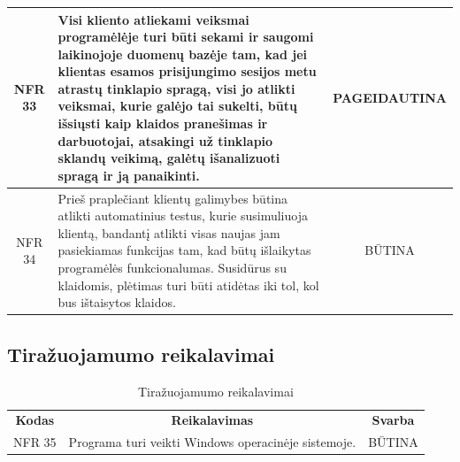 \documentclass{VUMIFPSkursinis}
\begin{document}
{{{{{\begin{center}
\begin{table}[H]
\begin{tabular}{|p{2cm}|p{}|p{}|}
	\hline 	
		\multicolumn{1}{|c|}{NFR 33}&
		{Visi kliento atliekami veiksmai programėlėje turi būti sekami ir saugomi laikinojoje duomenų bazėje tam, kad jei klientas esamos prisijungimo sesijos metu atrastų tinklapio spragą, visi jo atlikti veiksmai, kurie galėjo tai sukelti, būtų išsiųsti kaip klaidos pranešimas ir darbuotojai, atsakingi už tinklapio sklandų veikimą, galėtų išanalizuoti spragą ir ją panaikinti.}&
		\multicolumn{1}{|p{1.5cm}|}{PAGEIDAUTINA}\\
	
	\hline 	
		\multicolumn{1}{|c|}{NFR 34}&
		{Prieš praplečiant klientų galimybes būtina atlikti automatinius testus, kurie susimuliuoja klientą, bandantį atlikti visas naujas jam pasiekiamas funkcijas tam, kad būtų išlaikytas programėlės funkcionalumas. Susidūrus su klaidomis, plėtimas turi būti atidėtas iki tol, kol bus ištaisytos klaidos.}&
		\multicolumn{1}{|c|}{BŪTINA}\\	
		
	\hline 	
	
	\end{tabular}
	
	\label{table:Aptarnavimoirpriežiūrosreikalavimai}
	\end{table}

\end{center}

\subsection{Tiražuojamumo reikalavimai}
\begin{center}
	\begin{table}[H]
	\caption{Tiražuojamumo reikalavimai}
	\begin{tabular}{|p{2cm}|p{}|p{}|}
	\hline
	    \rowcolor{lightgray}
		\multicolumn{3}{|c|}{Tiražuojamumo reikalavimai}\\
		
	\hline
		\multicolumn{1}{|c|}{{\bfseries Kodas}}&
		\multicolumn{1}{|c|}{{\bfseries Reikalavimas}}&
		\multicolumn{1}{|c|}{{\bfseries Svarba}}\\
	\hline 	
		\multicolumn{1}{|c|}{NFR 35}&
		{Programa turi veikti Windows operacinėje sistemoje.}&
		\multicolumn{1}{|c|}{BŪTINA}\\	
	
	\hline 	
	\end{tabular}
	
	\label{table:Tiražuojamumoreikalavimai}
	\end{table}


\end{center}}}}}}
\end{document}
